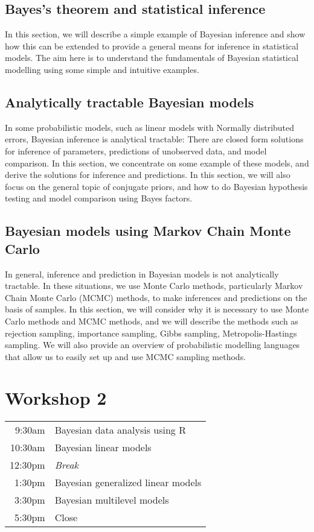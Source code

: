 \documentclass{mjandrews.notes.nomp}
\begin{document}
\subsection*{Bayes's theorem and statistical inference}

In this section, we will describe a simple example of Bayesian inference and
show how this can be extended to provide a general means for inference in
statistical models. The aim here is to understand the fundamentals of Bayesian
statistical modelling using some simple and intuitive examples.

\subsection*{Analytically tractable Bayesian models}

In some probabilistic models, such as linear models with Normally distributed
errors, Bayesian inference is analytical tractable: There are closed form
solutions for inference of parameters, predictions of unobserved data, and
model comparison.  In this section, we concentrate on some example of these
models, and derive the solutions for inference and predictions. In this
section, we will also focus on the general topic of conjugate priors, and how
to do Bayesian hypothesis testing and model comparison using Bayes factors.

\subsection*{Bayesian models using Markov Chain Monte Carlo}

In general, inference and prediction in Bayesian models is not analytically
tractable. In these situations, we use Monte Carlo methods, particularly Markov
Chain Monte Carlo (MCMC) methods, to make inferences and predictions on the
basis of samples. In this section, we will consider why it is necessary to use
Monte Carlo methods and MCMC methods, and we will describe the methods such as
rejection sampling, importance sampling, Gibbs sampling, Metropolis-Hastings
sampling. We will also provide an overview of probabilistic modelling languages
that allow us to easily set up and use MCMC sampling methods.

\section{Workshop 2}

\begin{center}
	\begin{tabular}{rp{}}
		9:30am & Bayesian data analysis using R\\
		10:30am & Bayesian linear models \\
		12:30pm & \emph{Break} \\
		1:30pm & Bayesian generalized linear models \\
		3:30pm & Bayesian multilevel models \\
		5:30pm & Close  \\
\end{tabular}
\end{center}
\end{document}
